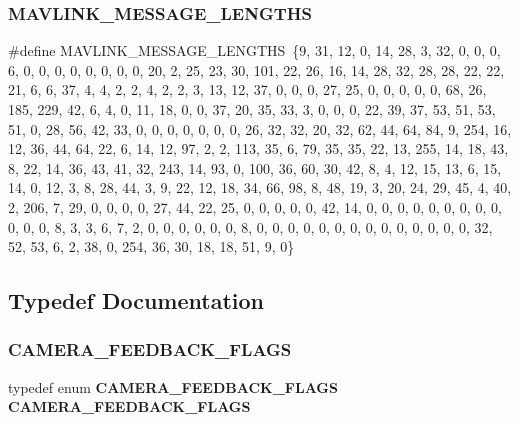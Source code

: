 \subsubsection{M\+A\+V\+L\+I\+N\+K\+\_\+\+M\+E\+S\+S\+A\+G\+E\+\_\+\+L\+E\+N\+G\+T\+HS}
{\footnotesize\ttfamily \#define M\+A\+V\+L\+I\+N\+K\+\_\+\+M\+E\+S\+S\+A\+G\+E\+\_\+\+L\+E\+N\+G\+T\+HS~\{9, 31, 12, 0, 14, 28, 3, 32, 0, 0, 0, 6, 0, 0, 0, 0, 0, 0, 0, 0, 20, 2, 25, 23, 30, 101, 22, 26, 16, 14, 28, 32, 28, 28, 22, 22, 21, 6, 6, 37, 4, 4, 2, 2, 4, 2, 2, 3, 13, 12, 37, 0, 0, 0, 27, 25, 0, 0, 0, 0, 0, 68, 26, 185, 229, 42, 6, 4, 0, 11, 18, 0, 0, 37, 20, 35, 33, 3, 0, 0, 0, 22, 39, 37, 53, 51, 53, 51, 0, 28, 56, 42, 33, 0, 0, 0, 0, 0, 0, 0, 26, 32, 32, 20, 32, 62, 44, 64, 84, 9, 254, 16, 12, 36, 44, 64, 22, 6, 14, 12, 97, 2, 2, 113, 35, 6, 79, 35, 35, 22, 13, 255, 14, 18, 43, 8, 22, 14, 36, 43, 41, 32, 243, 14, 93, 0, 100, 36, 60, 30, 42, 8, 4, 12, 15, 13, 6, 15, 14, 0, 12, 3, 8, 28, 44, 3, 9, 22, 12, 18, 34, 66, 98, 8, 48, 19, 3, 20, 24, 29, 45, 4, 40, 2, 206, 7, 29, 0, 0, 0, 0, 27, 44, 22, 25, 0, 0, 0, 0, 0, 42, 14, 0, 0, 0, 0, 0, 0, 0, 0, 0, 0, 0, 0, 8, 3, 3, 6, 7, 2, 0, 0, 0, 0, 0, 0, 8, 0, 0, 0, 0, 0, 0, 0, 0, 0, 0, 0, 0, 0, 0, 32, 52, 53, 6, 2, 38, 0, 254, 36, 30, 18, 18, 51, 9, 0\}}



\subsection{Typedef Documentation}
\mbox{\label{ardupilotmega_8h_af9704a04fde7831803524971b590554a}} 
\subsubsection{C\+A\+M\+E\+R\+A\+\_\+\+F\+E\+E\+D\+B\+A\+C\+K\+\_\+\+F\+L\+A\+GS}
{\footnotesize\ttfamily typedef enum \textbf{ C\+A\+M\+E\+R\+A\+\_\+\+F\+E\+E\+D\+B\+A\+C\+K\+\_\+\+F\+L\+A\+GS}  \textbf{ C\+A\+M\+E\+R\+A\+\_\+\+F\+E\+E\+D\+B\+A\+C\+K\+\_\+\+F\+L\+A\+GS}}

\mbox{\label{ardupilotmega_8h_aae98631afc97ad68da7cd43a32a4d759}} 
